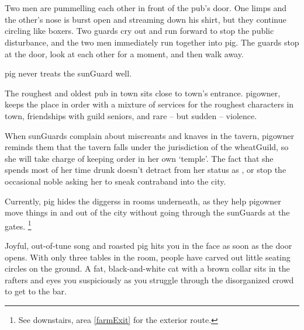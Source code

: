 \section{}

\begin{multicols}{2}

\begin{boxtext}
  Two men are pummelling each other in front of the pub's door.
   One limps and the other's nose is burst open and streaming down his shirt, but they continue circling like boxers.
   Two guards cry out and run forward to stop the public disturbance, and the two men immediately run together into \gls{pig}.
   The guards stop at the door, look at each other for a moment, and then walk away.

  \Gls{pig} never treats the \gls{sunGuard} well.
\end{boxtext}
 
The roughest and oldest pub in \gls{town} sits close to \gls{town}'s entrance.
\Gls{pigowner}, keeps the place in order with a mixture of services for the roughest characters in \gls{town}, friendships with guild seniors, and rare -- but sudden -- violence.

When \glspl{sunGuard} complain about miscreants and knaves in the tavern, \gls{pigowner} reminds them that the tavern falls under the jurisdiction of the \gls{wheatGuild}, so she will take charge of keeping order in her own `temple'.
The fact that she spends most of her time drunk doesn't detract from her status as , or stop the occasional noble asking her to sneak contraband into the city.

Currently, \gls{pig} hides the \glspl{diggers} in rooms underneath, as they help \gls{pigowner} move things in and out of the city without going through the \glspl{sunGuard} at the gates.%
\footnote{See downstairs, area \vref{farmExit} for the exterior route.}

\begin{boxtext}
  Joyful, out-of-tune song and roasted pig hits you in the face as soon as the door opens.
  With only three tables in the room, people have carved out little seating circles on the ground.
  A fat, black-and-white cat with a brown collar sits in the rafters and eyes you suspiciously as you struggle through the disorganized crowd to get to the bar.
\end{boxtext}
\label{pigCat}



\end{multicols}
